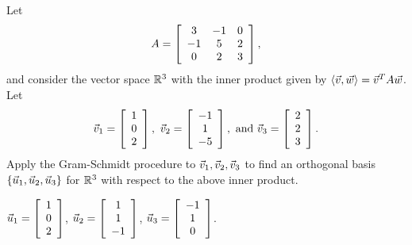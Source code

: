 \documentclass{ximera}
\begin{document}
\begin{exercise}
  Let
  \begin{equation*}
    A = \startmat{ccc}
      3 & -1 & 0 \\
      -1 & 5 & 2 \\
      0 & 2 & 3 \\
    \stopmat,
  \end{equation*}
  and consider the vector space $\R^3$ with the inner product given by
  $\iprod{\vect{v},\vect{w}} = \vect{v}^T A\vect{w}$.
  Let
  \begin{equation*}
    \vect{v}_1 = \startmat{c} 1 \\ 0 \\ 2 \stopmat,
    \quad
    \vect{v}_2 = \startmat{c} -1 \\ 1 \\ -5 \stopmat,
    \quad\mbox{and}\quad
    \vect{v}_3 = \startmat{c} 2 \\ 2 \\ 3 \stopmat.
  \end{equation*}
  Apply the Gram-Schmidt procedure to
  $\vect{v}_1,\vect{v}_2,\vect{v}_3$ to find an orthogonal basis
  $\set{\vect{u}_1,\vect{u}_2,\vect{u}_3}$ for $\R^3$ with respect to
  the above inner product.
  \begin{solution}
    $\vect{u}_1 = \startmat{c} 1 \\ 0 \\ 2 \stopmat$,
    $\vect{u}_2 = \startmat{c} 1 \\ 1 \\ -1 \stopmat$,
    $\vect{u}_3 = \startmat{c} -1 \\ 1 \\ 0 \stopmat$.
  \end{solution}
\end{exercise}
\end{document}
